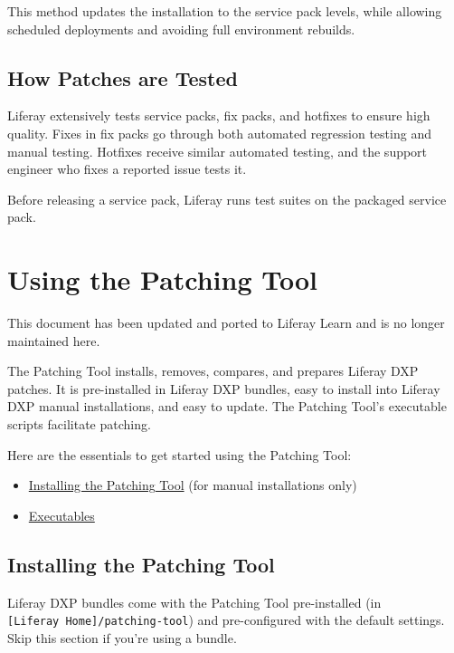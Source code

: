 This method updates the installation to the service pack levels, while
allowing scheduled deployments and avoiding full environment rebuilds.

\section{How Patches are Tested}\label{how-patches-are-tested}

Liferay extensively tests service packs, fix packs, and hotfixes to
ensure high quality. Fixes in fix packs go through both automated
regression testing and manual testing. Hotfixes receive similar
automated testing, and the support engineer who fixes a reported issue
tests it.

Before releasing a service pack, Liferay runs test suites on the
packaged service pack.

\chapter{Using the Patching Tool}\label{using-the-patching-tool}

{This document has been updated and ported to Liferay Learn and is no
longer maintained here.}

The Patching Tool installs, removes, compares, and prepares Liferay DXP
patches. It is pre-installed in Liferay DXP bundles, easy to install
into Liferay DXP manual installations, and easy to update. The Patching
Tool's executable scripts facilitate patching.

Here are the essentials to get started using the Patching Tool:

\begin{itemize}
\tightlist
\item
  \hyperref[installing-the-patching-tool]{Installing the Patching Tool}
  (for manual installations only)
\item
  \hyperref[executables]{Executables}
\end{itemize}

\section{Installing the Patching
Tool}\label{installing-the-patching-tool}

Liferay DXP bundles come with the Patching Tool pre-installed (in
\texttt{{[}Liferay\ Home{]}/patching-tool}) and pre-configured with the
default settings. Skip this section if you're using a bundle.

